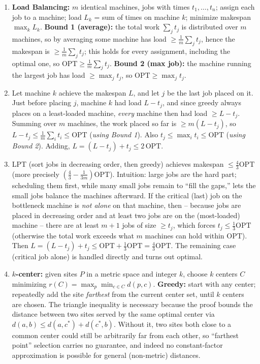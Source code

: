 \documentclass[11pt]{article}
\begin{document}
\begin{enumerate}[label=\textbf{A\arabic*.}, leftmargin=2.2em]
\item \textbf{Load Balancing:} $m$ identical machines, jobs with times $t_1, \ldots, t_n$;
assign each job to a machine; load $L_k$ = sum of times on machine $k$; minimize makespan
$\max_k L_k$. \textbf{Bound 1 (average):} the total work $\sum_j t_j$ is distributed over
$m$ machines, so by averaging some machine has load $\ge \frac1m\sum_j t_j$, hence the
makespan is $\ge \frac1m\sum_j t_j$; this holds for every assignment, including the
optimal one, so $\mathrm{OPT} \ge \frac1m\sum_j t_j$. \textbf{Bound 2 (max job):} the
machine running the largest job has load $\ge \max_j t_j$, so $\mathrm{OPT} \ge \max_j
t_j$.

\item Let machine $k$ achieve the makespan $L$, and let $j$ be the last job placed on it.
Just before placing $j$, machine $k$ had load $L - t_j$, and since greedy always places on
a least-loaded machine, \emph{every} machine then had load $\ge L - t_j$. Summing over
$m$ machines, the work placed so far is $\ge m(L - t_j)$, so $L - t_j \le \frac1m\sum_i t_i
\le \mathrm{OPT}$ (\emph{using Bound 1}). Also $t_j \le \max_i t_i \le \mathrm{OPT}$
(\emph{using Bound 2}). Adding, $L = (L - t_j) + t_j \le 2\,\mathrm{OPT}$.

\item LPT (sort jobs in decreasing order, then greedy) achieves makespan $\le \frac43
\mathrm{OPT}$ (more precisely $(\frac43 - \frac{1}{3m})\mathrm{OPT}$). Intuition: large
jobs are the hard part; scheduling them first, while many small jobs remain to ``fill the
gaps,'' lets the small jobs balance the machines afterward. If the critical (last) job on
the bottleneck machine is \emph{not alone} on that machine, then -- because jobs are placed
in decreasing order and at least two jobs are on the (most-loaded) machine -- there are at
least $m+1$ jobs of size $\ge t_j$, which forces $t_j \le \frac13\mathrm{OPT}$ (otherwise
the total work exceeds what $m$ machines can hold within $\mathrm{OPT}$). Then $L = (L -
t_j) + t_j \le \mathrm{OPT} + \frac13\mathrm{OPT} = \frac43\mathrm{OPT}$. The remaining
case (critical job alone) is handled directly and turns out optimal.

\item \textbf{$k$-center:} given sites $P$ in a metric space and integer $k$, choose $k$
centers $C$ minimizing $r(C) = \max_{p}\min_{c\in C} d(p,c)$. \textbf{Greedy:} start with
any center; repeatedly add the site \emph{farthest} from the current center set, until $k$
centers are chosen. The triangle inequality is necessary because the proof bounds the
distance between two sites served by the same optimal center via $d(a,b) \le d(a,c^\ast) +
d(c^\ast,b)$. Without it, two sites both close to a common center could still be
arbitrarily far from each other, so ``farthest point'' selection carries no guarantee, and
indeed no constant-factor approximation is possible for general (non-metric) distances.


\end{enumerate}
\end{document}
